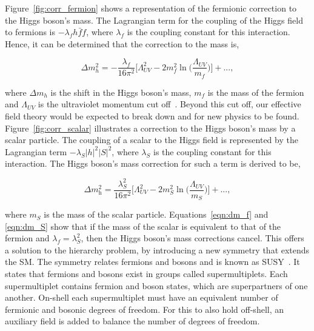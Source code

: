 Figure~\ref{fig:corr_fermion} shows a representation of the fermionic correction to the Higgs boson's mass. 
The Lagrangian term for the coupling of the Higgs field to fermions is $-\lambda_f h \bar{f} f$, where $\lambda_f$ is the coupling constant for this interaction. 
Hence, it can be determined that the correction to the mass is,

\begin{equation}
\Delta m_{h}^{2} =  -\frac{\lambda_f}{16\pi^2}\Big[\Lambda_{UV}^{2} -2m_{f}^{2} \ln\Big(\frac{\Lambda_{UV}}{m_f}\Big) \Big] + ... ,
\label{eqn:dm_f}
\end{equation}

where $\Delta m_{h}$ is the shift in the Higgs boson's mass, $m_f$ is the mass of the fermion and $\Lambda_{UV}$ is the ultraviolet momentum cut off~\cite{SUSY_Primer}.
Beyond this cut off, our effective field theory would be expected to break down and for new physics to be found. \\

Figure~\ref{fig:corr_scalar} illustrates a correction to the Higgs boson's mass by a scalar particle. 
The coupling of a scalar to the Higgs field is represented by the Lagrangian term $-\lambda_S |h|^2 |S|^2$, where $\lambda_S$ is the coupling constant for this interaction. 
The Higgs boson's mass correction for such a term is derived to be,

\begin{equation}
    \Delta m_{\text{h}}^{2} =  \frac{\lambda_{S}^{2}}{16\pi^2}\Big[\Lambda_{UV}^{2} -2m_{S}^{2} \ln\Big(\frac{\Lambda_{UV}}{m_S}\Big) \Big] + ... ,
    \label{eqn:dm_S}
\end{equation}

where $m_S$ is the mass of the scalar particle.
Equations~\ref{eqn:dm_f} and \ref{eqn:dm_S} show that if the mass of the scalar is equivalent to that of the fermion and $\lambda_f = \lambda_{S}^{2}$, then the Higgs boson's mass corrections cancel. 
This offers a solution to the hierarchy problem, by introducing a new symmetry that extends the \ac{SM}. 
The symmetry relates fermions and bosons and is known as \ac{SUSY}~\cite{SUSY_Primer}. 
It states that fermions and bosons exist in groups called supermultiplets. 
Each supermultiplet contains fermion and boson states, which are superpartners of one another. 
On-shell each supermultiplet must have an equivalent number of fermionic and bosonic degrees of freedom. 
For this to also hold off-shell, an auxiliary field is added to balance the number of degrees of freedom. \\

